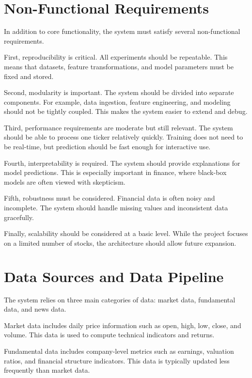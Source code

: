 \documentclass[12pt,a4paper]{article}
\begin{document}
\section{Non-Functional Requirements}

In addition to core functionality, the system must satisfy several non-functional requirements.

First, reproducibility is critical. All experiments should be repeatable. This means that datasets, feature transformations, and model parameters must be fixed and stored.

Second, modularity is important. The system should be divided into separate components. For example, data ingestion, feature engineering, and modeling should not be tightly coupled. This makes the system easier to extend and debug.

Third, performance requirements are moderate but still relevant. The system should be able to process one ticker relatively quickly. Training does not need to be real-time, but prediction should be fast enough for interactive use.

Fourth, interpretability is required. The system should provide explanations for model predictions. This is especially important in finance, where black-box models are often viewed with skepticism.

Fifth, robustness must be considered. Financial data is often noisy and incomplete. The system should handle missing values and inconsistent data gracefully.

Finally, scalability should be considered at a basic level. While the project focuses on a limited number of stocks, the architecture should allow future expansion.

\section{Data Sources and Data Pipeline}

The system relies on three main categories of data: market data, fundamental data, and news data.

Market data includes daily price information such as open, high, low, close, and volume. This data is used to compute technical indicators and returns.

Fundamental data includes company-level metrics such as earnings, valuation ratios, and financial structure indicators. This data is typically updated less frequently than market data.
\end{document}
